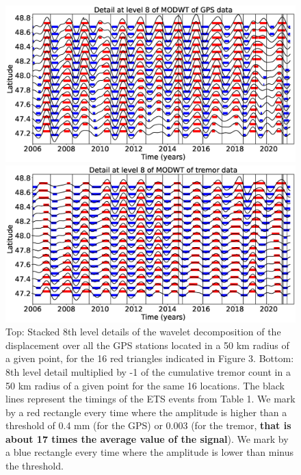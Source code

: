 \documentclass{article}
\begin{document}
\begin{figure}
\noindent\includegraphics[width=\textwidth, trim={0cm 0cm 0cm 0cm},clip]{figures/GPS_longer_detail_8.eps}

\noindent\includegraphics[width=\textwidth, trim={0cm 0cm 0cm 0cm},clip]{figures/tremor_longer_detail_8.eps}
\caption{Top: Stacked 8th level details of the wavelet decomposition of the displacement over all the GPS stations located in a 50 km radius of a given point, for the 16 red triangles indicated in Figure 3. Bottom: 8th level detail multiplied by -1 of the cumulative tremor count in a 50 km radius of a given point for the same 16 locations. The black lines represent the timings of the ETS events from Table 1. We mark by a red rectangle every time where the amplitude is higher than a threshold of 0.4 mm (for the GPS) or 0.003 (for the tremor, \textbf{that is about 17 times the average value of the signal}). We mark by a blue rectangle every time where the amplitude is lower than minus the threshold.}
\label{pngfiguresample}
\end{figure}
\end{document}
